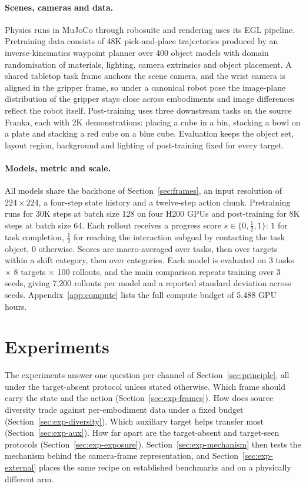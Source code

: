 \paragraph{Scenes, cameras and data.}
Physics runs in MuJoCo through robosuite and rendering uses its EGL pipeline. Pretraining data consists of 48K pick-and-place trajectories produced by an inverse-kinematics waypoint planner over 400 object models with domain randomisation of materials, lighting, camera extrinsics and object placement. A shared tabletop task frame anchors the scene camera, and the wrist camera is aligned in the gripper frame, so under a canonical robot pose the image-plane distribution of the gripper stays close across embodiments and image differences reflect the robot itself. Post-training uses three downstream tasks on the source Franka, each with 2K demonstrations: placing a cube in a bin, stacking a bowl on a plate and stacking a red cube on a blue cube. Evaluation keeps the object set, layout region, background and lighting of post-training fixed for every target.

\paragraph{Models, metric and scale.}
All models share the backbone of Section~\ref{sec:frames}, an input resolution of $224 \times 224$, a four-step state history and a twelve-step action chunk. Pretraining runs for 30K steps at batch size 128 on four H200 GPUs and post-training for 8K steps at batch size 64. Each rollout receives a progress score $s \in \{0, \tfrac{1}{2}, 1\}$: $1$ for task completion, $\tfrac{1}{2}$ for reaching the interaction subgoal by contacting the task object, $0$ otherwise. Scores are macro-averaged over tasks, then over targets within a shift category, then over categories. Each model is evaluated on 3 tasks $\times$ 8 targets $\times$ 100 rollouts, and the main comparison repeats training over 3 seeds, giving 7{,}200 rollouts per model and a reported standard deviation across seeds. Appendix~\ref{app:compute} lists the full compute budget of 5{,}488 GPU hours.

\section{Experiments}
\label{sec:exp}

The experiments answer one question per channel of Section~\ref{sec:principle}, all under the target-absent protocol unless stated otherwise. Which frame should carry the state and the action (Section~\ref{sec:exp-frames}). How does source diversity trade against per-embodiment data under a fixed budget (Section~\ref{sec:exp-diversity}). Which auxiliary target helps transfer most (Section~\ref{sec:exp-aux}). How far apart are the target-absent and target-seen protocols (Section~\ref{sec:exp-exposure}). Section~\ref{sec:exp-mechanism} then tests the mechanism behind the camera-frame representation, and Section~\ref{sec:exp-external} places the same recipe on established benchmarks and on a physically different arm.

